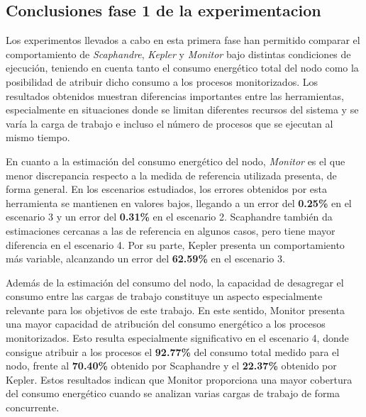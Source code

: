 \subsection{Conclusiones fase 1 de la experimentacion }
Los experimentos llevados a cabo en esta primera fase han permitido comparar el comportamiento de \textit{Scaphandre}, \textit{Kepler} y \textit{Monitor} bajo distintas condiciones de ejecución, teniendo en cuenta tanto el consumo energético total del nodo como la posibilidad de atribuir dicho consumo a los procesos monitorizados. Los resultados obtenidos muestran diferencias importantes entre las herramientas, especialmente en situaciones donde se limitan diferentes recursos del sistema y se varía la carga de trabajo e incluso el número de procesos que se ejecutan al mismo tiempo.

En cuanto a la estimación del consumo energético del nodo, \textit{Monitor} es el que menor discrepancia respecto a la medida de referencia utilizada presenta, de forma general. En los escenarios estudiados, los errores obtenidos por esta herramienta se mantienen en valores bajos, llegando a un error del \textbf{0.25\%} en el escenario 3 y un error del \textbf{0.31\%} en el escenario 2. Scaphandre también da estimaciones cercanas a las de referencia en algunos casos, pero tiene mayor diferencia en el escenario 4. Por su parte, Kepler presenta un comportamiento más variable, alcanzando un error del \textbf{62.59\%} en el escenario 3.


Además de la estimación del consumo del nodo, la capacidad de desagregar el consumo entre las cargas de trabajo constituye un aspecto especialmente relevante para los objetivos de este trabajo. En este sentido, Monitor presenta una mayor capacidad de atribución del consumo energético a los procesos monitorizados. Esto resulta especialmente significativo en el escenario 4, donde consigue atribuir a los procesos el \textbf{92.77\%} del consumo total medido para el nodo, frente al \textbf{70.40\%} obtenido por Scaphandre y el \textbf{22.37\%} obtenido por Kepler. Estos resultados indican que Monitor proporciona una mayor cobertura del consumo energético cuando se analizan varias cargas de trabajo de forma concurrente.


